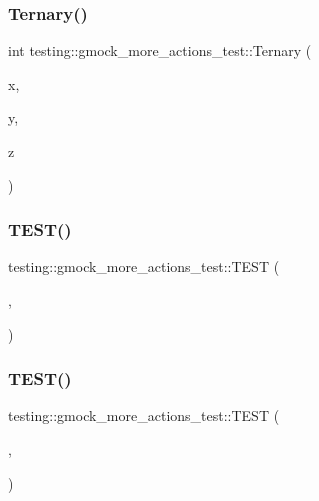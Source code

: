 \subsubsection{\texorpdfstring{Ternary()}{Ternary()}}
{\footnotesize\ttfamily int testing\+::gmock\+\_\+more\+\_\+actions\+\_\+test\+::\+Ternary (\begin{DoxyParamCaption}\item[{int}]{x,  }\item[{char}]{y,  }\item[{short}]{z }\end{DoxyParamCaption})}

\mbox{\label{namespacetesting_1_1gmock__more__actions__test_a9c5fbd26c6cc6ed31aed5bafb2fa8e5c}} 
\subsubsection{\texorpdfstring{TEST()}{TEST()}\hspace{0.1cm}{\footnotesize\ttfamily [1/47]}}
{\footnotesize\ttfamily testing\+::gmock\+\_\+more\+\_\+actions\+\_\+test\+::\+T\+E\+ST (\begin{DoxyParamCaption}\item[{Invoke\+Test}]{,  }\item[{\mbox{\hyperlink{namespacetesting_1_1gmock__more__actions__test_acdd2dd80f777fdb770b513b63064ac19}{Nullary}}}]{ }\end{DoxyParamCaption})}

\mbox{\label{namespacetesting_1_1gmock__more__actions__test_a28b57a9f9d38574b7c033988ad528ddd}} 
\subsubsection{\texorpdfstring{TEST()}{TEST()}\hspace{0.1cm}{\footnotesize\ttfamily [2/47]}}
{\footnotesize\ttfamily testing\+::gmock\+\_\+more\+\_\+actions\+\_\+test\+::\+T\+E\+ST (\begin{DoxyParamCaption}\item[{Invoke\+Test}]{,  }\item[{\mbox{\hyperlink{namespacetesting_1_1gmock__more__actions__test_aad456ea2ee1b0cb2741b676a34f540a3}{Unary}}}]{ }\end{DoxyParamCaption})}


